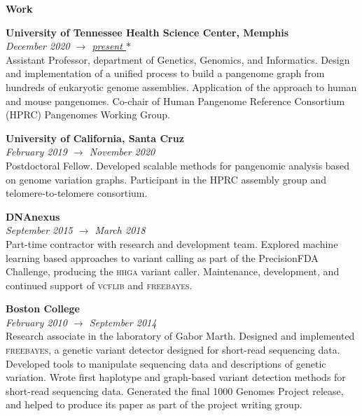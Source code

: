 \documentclass[11pt,hidelinks,letterpaper]{article}
\begin{document}
\begin{comment}
{\large
  I am a computational biologist. I work as an assistant professor at the University of Tennessee Health Science Center in Memphis.
  I started in quantitative social science, then moved to genomes, focusing on their variation.
  I learned the importance of open-source software through studying collaboration, which led me to bioinformatics.
  Now, I'm researching how to synthesize DNA as easily as we read it.
}
\end{comment}

\hfill \break
\noindent
{\LARGE \bf Work}

\hfill \break
\noindent
{\large \bf University of Tennessee Health Science Center, Memphis} \\
\emph{December 2020 $\to$ \underline{present {\LARGE $\ast$}}} \\
\noindent
Assistant Professor, department of Genetics, Genomics, and Informatics.
Design and implementation of a unified process to build a pangenome graph from hundreds of eukaryotic genome assemblies.
Application of the approach to human and mouse pangenomes.
Co-chair of Human Pangenome Reference Consortium (HPRC) Pangenomes Working Group.

\hfill \break
\noindent
{\large \bf University of California, Santa Cruz} \\
\emph{February 2019 $\to$ November 2020} \\
\noindent
Postdoctoral Fellow. %
Developed scalable methods for pangenomic analysis based on genome variation graphs.
Participant in the HPRC assembly group and telomere-to-telomere consortium.

\hfill \break
\noindent
{\large \bf DNAnexus} \\
\emph{September 2015 $\to$ March 2018} \\
\noindent
Part-time contractor with research and development team. Explored machine learning based approaches to variant calling as part of the PrecisionFDA Challenge, producing the \textsc{hhga} variant caller.
Maintenance, development, and continued support of \textsc{vcflib} and \textsc{freebayes}.

\hfill \break
\noindent
{\large \bf Boston College} \\
\emph{February 2010 $\to$ September 2014} \\
Research associate in the laboratory of Gabor Marth.
Designed and implemented \textsc{freebayes}, a genetic variant detector designed for short-read sequencing data.
Developed tools to manipulate sequencing data and descriptions of genetic variation.
Wrote first haplotype and graph-based variant detection methods for short-read sequencing data.
Generated the final 1000 Genomes Project release, and helped to produce its paper as part of the project writing group.
\end{document}
